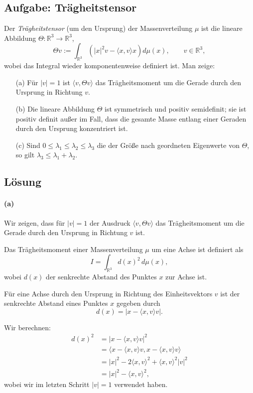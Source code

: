 \documentclass{article}
\newcommand{\R}{\mathbb{R}}
\begin{document}
\subsection*{Aufgabe: Trägheitstensor}

Der \emph{Trägheitstensor} (um den Ursprung) der Massenverteilung
$\mu$ ist die lineare Abbildung $\Theta \colon \R^3 \to \R^3$,
$$
\Theta v := \int_{\R^3} \left( |x|^2v - \langle x, v\rangle x \right) d\mu(x), \qquad v \in \R^3,
$$
wobei das Integral wieder komponentenweise definiert ist. Man zeige:

\begin{enumerate}
	\item[(a)] Für $|v| = 1$ ist $\langle v, \Theta v \rangle$ das Trägheitsmoment um
	die Gerade durch den Ursprung in Richtung $v$.
	\item[(b)] Die lineare Abbildung $\Theta$ ist symmetrisch und positiv
	semidefinit; sie ist positiv definit außer im Fall, dass die gesamte
	Masse entlang einer Geraden durch den Ursprung konzentriert ist.
	\item[(c)] Sind $0 \le \lambda_1 \le \lambda_2 \le \lambda_3$ die der Größe
	nach geordneten Eigenwerte von $\Theta$, so gilt $\lambda_3 \le \lambda_1 + \lambda_2$.
\end{enumerate}

\subsection*{Lösung}

\paragraph{(a)} Wir zeigen, dass für $|v| = 1$ der Ausdruck $\langle v, \Theta v \rangle$ das Trägheitsmoment um die Gerade durch den Ursprung in Richtung $v$ ist.

Das Trägheitsmoment einer Massenverteilung $\mu$ um eine Achse ist definiert als
$$I = \int_{\R^3} d(x)^2 \, d\mu(x),$$
wobei $d(x)$ der senkrechte Abstand des Punktes $x$ zur Achse ist.

Für eine Achse durch den Ursprung in Richtung des Einheitsvektors $v$ ist der senkrechte Abstand eines Punktes $x$ gegeben durch
$$d(x) = |x - \langle x, v \rangle v|.$$

Wir berechnen:
\begin{align}
d(x)^2 &= |x - \langle x, v \rangle v|^2\\
&= \langle x - \langle x, v \rangle v, x - \langle x, v \rangle v \rangle\\
&= |x|^2 - 2\langle x, v \rangle^2 + \langle x, v \rangle^2 |v|^2\\
&= |x|^2 - \langle x, v \rangle^2,
\end{align}
wobei wir im letzten Schritt $|v| = 1$ verwendet haben.
\end{document}
